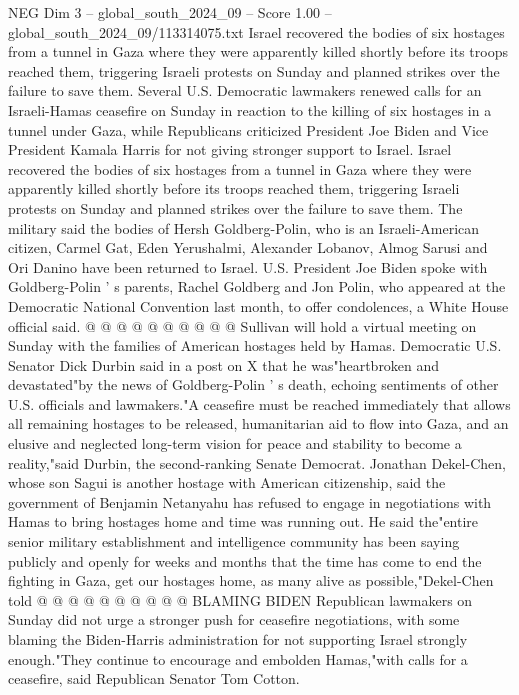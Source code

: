 \begin{textsample}{NEG Dim 3 – global\_south\_2024\_09 – Score 1.00 – global\_south\_2024\_09/113314075.txt}  \label{ex:f3_neg_131}
Israel recovered the bodies of six hostages from a tunnel in Gaza where they were apparently killed shortly before its troops reached them, triggering Israeli protests on Sunday and planned strikes over the failure to save them.
Several U.S.
Democratic lawmakers renewed calls for an Israeli-Hamas ceasefire on Sunday in reaction to the killing of six hostages in a tunnel under Gaza, while Republicans criticized President Joe Biden and Vice President Kamala Harris for not giving stronger support to Israel.
Israel recovered the bodies of six hostages from a tunnel in Gaza where they were apparently killed shortly before its troops reached them, triggering Israeli protests on Sunday and planned strikes over the failure to save them.
The military said the bodies of Hersh Goldberg-Polin, who is an Israeli-American citizen, Carmel Gat, Eden Yerushalmi, Alexander Lobanov, Almog Sarusi and Ori Danino have been returned to Israel.
U.S.
President Joe Biden spoke with Goldberg-Polin ' s parents, Rachel Goldberg and Jon Polin, who appeared at the Democratic National Convention last month, to offer condolences, a White House official said. @ @ @ @ @ @ @ @ @ @ Sullivan will hold a virtual meeting on Sunday with the families of American hostages held by Hamas.
Democratic U.S.
Senator Dick Durbin said in a post on X that he was"heartbroken and devastated"by the news of Goldberg-Polin ' s death, echoing sentiments of other U.S. officials and lawmakers."A ceasefire must be reached immediately that allows all remaining hostages to be released, humanitarian aid to flow into Gaza, and an elusive and neglected long-term vision for peace and stability to become a reality,"said Durbin, the second-ranking Senate Democrat.
Jonathan Dekel-Chen, whose son Sagui is another hostage with American citizenship, said the government of Benjamin Netanyahu has refused to engage in negotiations with Hamas to bring hostages home and time was running out.
He said the"entire senior military establishment and intelligence community has been saying publicly and openly for weeks and months that the time has come to end the fighting in Gaza, get our hostages home, as many alive as possible,"Dekel-Chen told @ @ @ @ @ @ @ @ @ @ BLAMING BIDEN Republican lawmakers on Sunday did not urge a stronger push for ceasefire negotiations, with some blaming the Biden-Harris administration for not supporting Israel strongly enough."They continue to encourage and embolden Hamas,"with calls for a ceasefire, said Republican Senator Tom Cotton.

\end{textsample}
